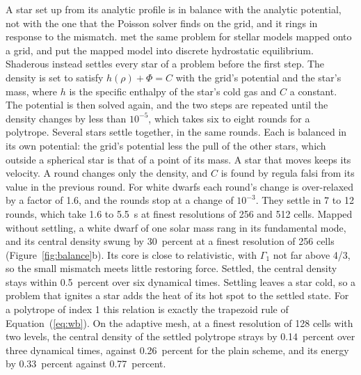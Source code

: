 \documentclass[twocolumn]{aastex701}
\begin{document}
A star set up from its analytic profile is in balance with the analytic potential, not with the one that the Poisson solver finds on the grid, and it rings in response to the mismatch. \citet{Zingale2002} met the same problem for stellar models mapped onto a grid, and put the mapped model into discrete hydrostatic equilibrium. Shaderous instead settles every star of a problem before the first step. The density is set to satisfy $h(\rho) + \Phi = C$ with the grid's potential and the star's mass, where $h$ is the specific enthalpy of the star's cold gas and $C$ a constant. The potential is then solved again, and the two steps are repeated until the density changes by less than $10^{-5}$, which takes six to eight rounds for a polytrope. Several stars settle together, in the same rounds. Each is balanced in its own potential: the grid's potential less the pull of the other stars, which outside a spherical star is that of a point of its mass. A star that moves keeps its velocity. A round changes only the density, and $C$ is found by regula falsi from its value in the previous round. For white dwarfs each round's change is over-relaxed by a factor of 1.6, and the rounds stop at a change of $10^{-3}$. They settle in 7 to 12 rounds, which take 1.6 to 5.5~s at finest resolutions of 256 and 512 cells. Mapped without settling, a white dwarf of one solar mass rang in its fundamental mode, and its central density swung by 30~percent at a finest resolution of 256 cells (Figure~\ref{fig:balance}b). Its core is close to relativistic, with $\Gamma_1$ not far above 4/3, so the small mismatch meets little restoring force. Settled, the central density stays within 0.5~percent over six dynamical times. Settling leaves a star cold, so a problem that ignites a star adds the heat of its hot spot to the settled state. For a polytrope of index 1 this relation is exactly the trapezoid rule of Equation~(\ref{eq:wb}). On the adaptive mesh, at a finest resolution of 128 cells with two levels, the central density of the settled polytrope strays by 0.14~percent over three dynamical times, against 0.26~percent for the plain scheme, and its energy by 0.33~percent against 0.77~percent.
\end{document}
